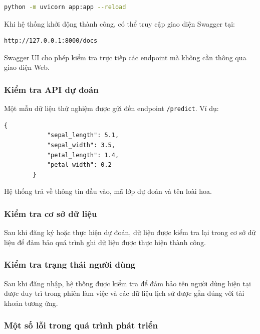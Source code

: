 \documentclass[14pt]{extarticle}
\begin{document}
	\begin{lstlisting}[language=bash, numbers=none, frame=single]
		python -m uvicorn app:app --reload
	\end{lstlisting}
	
	\noindent Khi hệ thống khởi động thành công, có thể truy cập giao diện Swagger tại:
	
	\begin{lstlisting}[numbers=none, frame=single]
		http://127.0.0.1:8000/docs
	\end{lstlisting}
	
	\noindent Swagger UI cho phép kiểm tra trực tiếp các endpoint mà không cần thông qua giao diện Web.
	
	\subsubsection{Kiểm tra API dự đoán}
	
	\noindent Một mẫu dữ liệu thử nghiệm được gửi đến endpoint \texttt{/predict}. Ví dụ:
	
	\begin{lstlisting}[numbers=none, frame=single]
		{
			"sepal_length": 5.1,
			"sepal_width": 3.5,
			"petal_length": 1.4,
			"petal_width": 0.2
		}
	\end{lstlisting}
	
	\noindent Hệ thống trả về thông tin đầu vào, mã lớp dự đoán và tên loài hoa.
	
	\subsubsection{Kiểm tra cơ sở dữ liệu}
	
	\noindent Sau khi đăng ký hoặc thực hiện dự đoán, dữ liệu được kiểm tra lại trong cơ sở dữ liệu để đảm bảo quá trình ghi dữ liệu được thực hiện thành công.
	
	\subsubsection{Kiểm tra trạng thái người dùng}
	
	\noindent Sau khi đăng nhập, hệ thống được kiểm tra để đảm bảo tên người dùng hiện tại được duy trì trong phiên làm việc và các dữ liệu lịch sử được gắn đúng với tài khoản tương ứng.
	
	\subsubsection{Một số lỗi trong quá trình phát triển}
	
\end{document}
